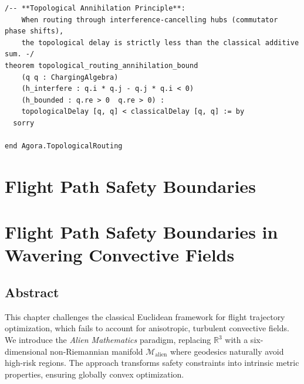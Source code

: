 \documentclass[11pt,a4paper]{book}
\begin{document}
\begin{lstlisting}[]
/-- **Topological Annihilation Principle**:
    When routing through interference-cancelling hubs (commutator phase shifts),
    the topological delay is strictly less than the classical additive sum. -/
theorem topological_routing_annihilation_bound
    (q q : ChargingAlgebra)
    (h_interfere : q.i * q.j - q.j * q.i < 0)
    (h_bounded : q.re > 0  q.re > 0) :
    topologicalDelay [q, q] < classicalDelay [q, q] := by
  sorry

end Agora.TopologicalRouting
\end{lstlisting}


\chapter{Flight Path Safety Boundaries}
\chapter{Flight Path Safety Boundaries in Wavering Convective Fields}

\section*{Abstract}
This chapter challenges the classical Euclidean framework for flight trajectory optimization, which fails to account for anisotropic, turbulent convective fields. We introduce the \textit{Alien Mathematics} paradigm, replacing $\mathbb{R}^3$ with a six-dimensional non-Riemannian manifold $\mathcal{M}_{\text{alien}}$ where geodesics naturally avoid high-risk regions. The approach transforms safety constraints into intrinsic metric properties, ensuring globally convex optimization.
\end{document}

